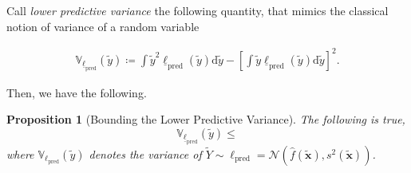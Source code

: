 \documentclass[12pt, english, oneside, a4paper]{article}
\newtheorem{proposition}[theorem]{Proposition}
\newcommand{\x}{\boldsymbol{x}}
\begin{document}









\iffalse
Call {\em lower predictive variance} the following quantity, that mimics the classical notion of variance of a random variable

\begin{align}\label{lower-variance}
    \mathbb{V}_{\underline{\ell}_\text{pred}}(\tilde{y}) \coloneqq \int \tilde{y}^2 \underline{\ell}_\text{pred}(\tilde{y}) \text{d}\tilde{y} - \left[\int \tilde{y} \underline{\ell}_\text{pred}(\tilde{y}) \text{d}\tilde{y}\right]^2.
\end{align}

Then, we have the following.

\begin{proposition}[Bounding the Lower Predictive Variance]\label{prop-var}
The following is true,
    $$\mathbb{V}_{\underline{\ell}_\text{pred}}(\tilde{y}) \leq 
    $$
    where $\mathbb{V}_{{\ell}_\text{pred}}(\tilde{y})$ denotes the variance of $\tilde{Y} \sim \ell_\text{pred}=\mathcal{N}(\hat{f}(\tilde{\x}),s^2(\tilde{\x}))$.
\end{proposition}
\end{document}
